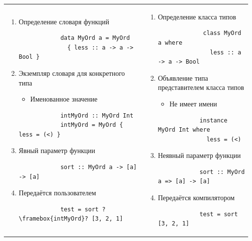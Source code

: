\begin{tabular}{p{8cm}p{8cm}}
    \begin{enumerate}
        \item Определение словаря функций
        \begin{verbatim}
            data MyOrd a = MyOrd
              { less :: a -> a -> Bool }
        \end{verbatim}
        \item Экземпляр словаря для конкретного типа
        \begin{itemize}
            \item Именованное значение
        \end{itemize}
        \begin{verbatim}
            intMyOrd :: MyOrd Int
            intMyOrd = MyOrd { less = (<) }
        \end{verbatim}
        \item Явный параметр функции
        \begin{verbatim}
            sort :: MyOrd a -> [a] -> [a]
        \end{verbatim}
        \item Передаётся пользователем
        \begin{verbatim}
            test = sort ?\framebox{intMyOrd}? [3, 2, 1]
        \end{verbatim}
    \end{enumerate}
    &
    \begin{enumerate}
        \item Определение класса типов
        \begin{verbatim}
             class MyOrd a where
               less :: a -> a -> Bool
        \end{verbatim}
        \item Объявление типа представителем класса типов
        \begin{itemize}
            \item Не имеет имени
        \end{itemize}
        \begin{verbatim}
            instance MyOrd Int where
              less = (<)
        \end{verbatim}
        \item Неявный параметр функции
        \begin{verbatim}
            sort :: MyOrd a => [a] -> [a]
        \end{verbatim}
        \item Передаётся компилятором
        \begin{verbatim}
            test = sort [3, 2, 1]
        \end{verbatim}
    \end{enumerate}
\end{tabular}

